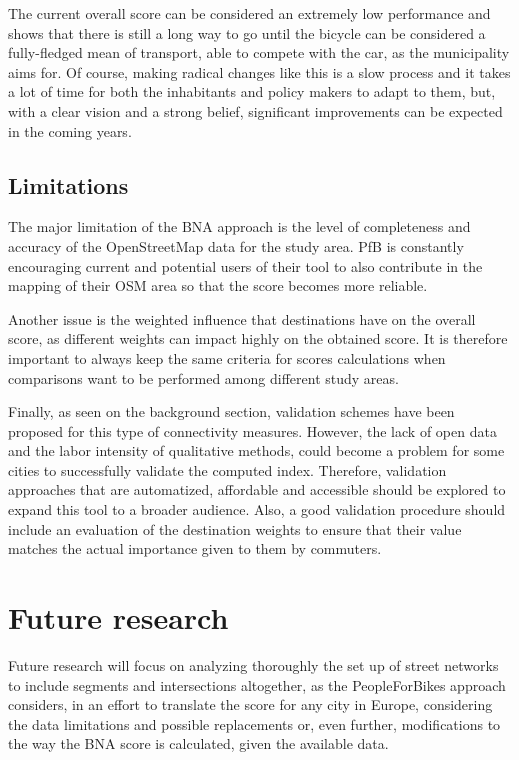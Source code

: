 \documentclass[information,article,submit,moreauthors,Latex,dvi2pdf,10pt,a4paper]{Definitions/mdpi}
\begin{document}
The current overall score can be considered an extremely low performance and shows that there is still a long way to go until the bicycle can be considered a fully-fledged mean of transport, able to compete with the car, as the municipality aims for. Of course, making radical changes like this is a slow process and it takes a lot of time for both the inhabitants and policy makers to adapt to them, but, with a clear vision and a strong belief, significant improvements can be expected in the coming years.

\subsection{Limitations}
\begin{mycolorbox}[colback=orange]
The major limitation of the BNA approach is the level of completeness and accuracy of the OpenStreetMap data for the study area. PfB is constantly encouraging current and potential users of their tool to also contribute in the mapping of their OSM area so that the score becomes more reliable.

Another issue is the weighted influence that destinations have on the overall score, as different weights can impact highly on the obtained score. It is therefore important to always keep the same criteria for scores calculations when comparisons want to be performed among different study areas.

Finally, as seen on the background section, validation schemes have been proposed for this type of connectivity measures. However, the lack of open data and the labor intensity of qualitative methods, could become a problem for some cities to successfully validate the computed index. Therefore, validation approaches that are automatized, affordable and accessible should be explored to expand this tool to a broader audience. Also, a good validation procedure should include an evaluation of the destination weights to ensure that their value matches the actual importance given to them by commuters.
\end{mycolorbox}

\section{Future research} \label{future}

Future research will focus on analyzing thoroughly the set up of street networks to include segments and intersections altogether, as the PeopleForBikes approach considers, in an effort to translate the score for any city in Europe, considering the data limitations and possible replacements or, even further, modifications to the way the BNA score is calculated, given the available data.
\end{document}
